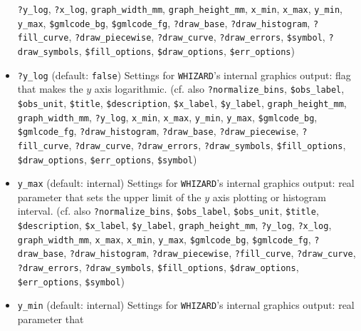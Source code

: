 \documentclass[12pt]{book}
\newcommand{\ttt}[1]{\texttt{#1}}
\newcommand{\whizard}{\texttt{WHIZARD}}
\begin{document}
\begin{itemize}
\ttt{?y\_log}, \ttt{?x\_log},
\ttt{graph\_width\_mm}, \ttt{graph\_height\_mm}, 
\ttt{x\_min}, \ttt{x\_max}, \ttt{y\_min}, \ttt{y\_max},
\newline \ttt{\$gmlcode\_bg}, \ttt{\$gmlcode\_fg}, \ttt{?draw\_base},
\ttt{?draw\_histogram}, \ttt{?fill\_curve}, \newline \ttt{?draw\_piecewise}, 
\ttt{?draw\_curve}, \ttt{?draw\_errors}, \ttt{\$symbol}, 
\ttt{?draw\_symbols}, \newline \ttt{\$fill\_options}, \ttt{\$draw\_options},
\ttt{\$err\_options})
\item
\ttt{?y\_log} \qquad (default: \ttt{false}) \newline
Settings for \whizard's internal graphics output: flag that
makes the $y$ axis logarithmic. (cf. also
\ttt{?normalize\_bins}, \ttt{\$obs\_label}, \ttt{\$obs\_unit},
\ttt{\$title}, \ttt{\$description}, \ttt{\$x\_label},
\ttt{\$y\_label}, \ttt{graph\_height\_mm}, \ttt{graph\_width\_mm}, 
\ttt{?y\_log}, \ttt{x\_min}, \ttt{x\_max},
\ttt{y\_min}, \ttt{y\_max}, \newline \ttt{\$gmlcode\_bg}, \ttt{\$gmlcode\_fg},
\ttt{?draw\_histogram}, \ttt{?draw\_base}, \ttt{?draw\_piecewise},
\newline \ttt{?fill\_curve}, \ttt{?draw\_curve}, \ttt{?draw\_errors},
\ttt{?draw\_symbols}, \ttt{\$fill\_options}, \newline \ttt{\$draw\_options},
\ttt{\$err\_options}, \ttt{\$symbol})
\item
\ttt{y\_max} \qquad (default: internal) \newline
Settings for \whizard's internal graphics output: real parameter that
sets the upper limit of the $y$ axis plotting or histogram interval. (cf. also
\ttt{?normalize\_bins}, \ttt{\$obs\_label}, \ttt{\$obs\_unit},
\ttt{\$title}, \ttt{\$description}, \ttt{\$x\_label},
\ttt{\$y\_label}, \ttt{graph\_height\_mm}, \ttt{?y\_log},
\newline \ttt{?x\_log}, \ttt{graph\_width\_mm}, \ttt{x\_max},
\ttt{x\_min}, \ttt{y\_max}, \ttt{\$gmlcode\_bg}, \ttt{\$gmlcode\_fg},
\ttt{?draw\_base}, \newline \ttt{?draw\_histogram}, \ttt{?draw\_piecewise},
\ttt{?fill\_curve}, \ttt{?draw\_curve}, \ttt{?draw\_errors},
\newline \ttt{?draw\_symbols}, \ttt{\$fill\_options}, \ttt{\$draw\_options},
\ttt{\$err\_options}, \ttt{\$symbol})
\item
\ttt{y\_min} \qquad (default: internal) \newline
Settings for \whizard's internal graphics output: real parameter that

\end{itemize}
\end{document}
